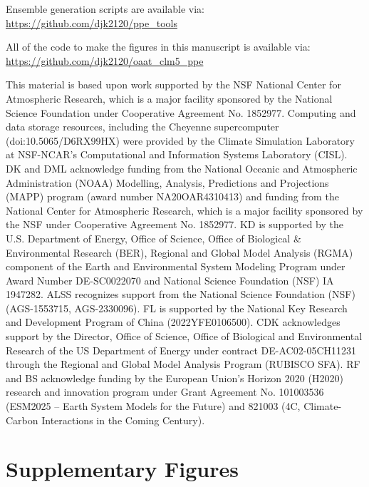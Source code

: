 \documentclass[draft]{agujournal2019}
\begin{document}
Ensemble generation scripts are available via: \\
\url{https://github.com/djk2120/ppe_tools}

All of the code to make the figures in this manuscript is available via: \\
\url{https://github.com/djk2120/oaat_clm5_ppe}






\acknowledgments
This material is based upon work supported by the NSF National Center for Atmospheric Research, which is a major facility sponsored by the National Science Foundation under Cooperative Agreement No. 1852977. Computing and data storage resources, including the Cheyenne supercomputer (doi:10.5065/D6RX99HX) were provided by the Climate Simulation Laboratory at NSF-NCAR’s Computational and Information Systems Laboratory (CISL). DK and DML acknowledge funding from the National Oceanic and Atmospheric Administration (NOAA) Modelling, Analysis, Predictions and Projections (MAPP) program (award number NA20OAR4310413) and funding from the National Center for Atmospheric Research, which is a major facility sponsored by the NSF under Cooperative Agreement No. 1852977. KD is supported by the U.S. Department of Energy, Office of Science, Office of Biological \& Environmental Research (BER), Regional and Global Model Analysis (RGMA) component of the Earth and Environmental System Modeling Program under Award Number DE-SC0022070 and National Science Foundation (NSF) IA 1947282. ALSS recognizes support from the National Science Foundation (NSF) (AGS-1553715, AGS-2330096). FL is supported by the National Key Research and Development Program of China (2022YFE0106500). CDK acknowledges support by the Director, Office of Science, Office of Biological and Environmental Research of the US Department of Energy under contract DE-AC02-05CH11231 through the Regional and Global Model Analysis Program (RUBISCO SFA). RF and BS acknowledge funding by the European Union’s Horizon 2020 (H2020) research and innovation program under Grant Agreement No. 101003536 (ESM2025 – Earth System Models for the Future) and 821003 (4C, Climate-Carbon Interactions in the Coming Century).





\appendix
\section{Supplementary Figures}
\end{document}
